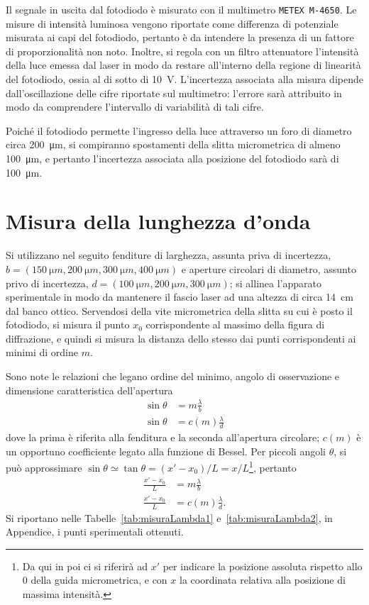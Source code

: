 \documentclass[10pt,oneside,a4paper]{article}
\begin{document}
\begin{multicols}{2}
Il segnale in uscita dal fotodiodo è misurato con il multimetro \texttt{METEX M-4650}. Le misure di intensità luminosa vengono riportate come differenza di potenziale misurata ai capi del fotodiodo, pertanto è da intendere la presenza di un fattore di proporzionalità non noto. Inoltre, si regola con un filtro attenuatore l'intensità della luce emessa dal laser in modo da restare all'interno della regione di linearità del fotodiodo, ossia al di sotto di \SI{10}{V}. L'incertezza associata alla misura dipende dall'oscillazione delle cifre riportate sul multimetro: l'errore sarà attribuito in modo da comprendere l'intervallo di variabilità di tali cifre. 

Poiché il fotodiodo permette l'ingresso della luce attraverso un foro di diametro circa \SI{200}{\micro m}, si compiranno spostamenti della slitta micrometrica di almeno \SI{100}{\micro m}, e pertanto l'incertezza associata alla posizione del fotodiodo sarà di \SI{100}{\micro m}.


\section{Misura della lunghezza d'onda}
Si utilizzano nel seguito fenditure di larghezza, assunta priva di incertezza, $b = (\SI{150}{\micro m}, \SI{200}{\micro m}, \SI{300}{\micro m}, \SI{400}{\micro m})$ e aperture circolari di diametro, assunto privo di incertezza, $d = (\SI{100}{\micro m}, \SI{200}{\micro m}, \SI{300}{\micro m})$; si allinea l'apparato sperimentale in modo da mantenere il fascio laser ad una altezza di circa \SI{14}{cm} dal banco ottico. Servendosi della vite micrometrica della slitta su cui è posto il fotodiodo, si misura il punto $x_0$ corrispondente al massimo della figura di diffrazione, e quindi si misura la distanza dello stesso dai punti corrispondenti ai minimi di ordine $m$.

Sono note le relazioni che legano ordine del minimo, angolo di osservazione e dimensione caratteristica dell'apertura
\[
\begin{aligned}
\sin\theta &= m\frac{\lambda}{b} \\
\sin\theta &= c(m)\frac{\lambda}{d}
\end{aligned}
\]
dove la prima è riferita alla fenditura e la seconda all'apertura circolare; $c(m)$ è un opportuno coefficiente legato alla funzione di Bessel. Per piccoli angoli $\theta$, si può approssimare $\sin\theta \simeq \tan\theta = (x'-x_0) / L = x/L$\footnote{Da qui in poi ci si riferirà ad $x'$ per indicare la posizione assoluta rispetto allo 0 della guida micrometrica, e con $x$ la coordinata relativa alla posizione di massima intensità.}, pertanto
\[
\begin{aligned}
\frac{x'-x_0}{L} &= m\frac{\lambda}{b} \\
\frac{x'-x_0}{L} &= c(m)\frac{\lambda}{d}.
\end{aligned}
\]
Si riportano nelle Tabelle~\ref{tab:misuraLambda1} e~\ref{tab:misuraLambda2}, in Appendice, i punti sperimentali ottenuti.


\end{multicols}
\end{document}
